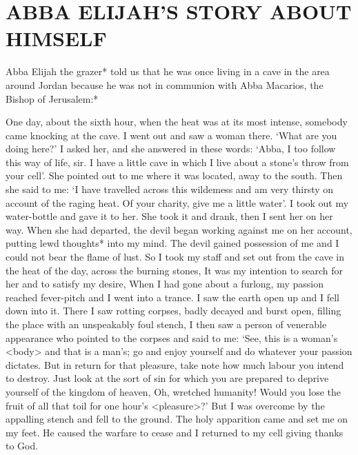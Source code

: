 \chapter{ABBA ELIJAH'S STORY ABOUT HIMSELF}

Abba Elijah the grazer* told us that he was once living in a cave in the area around Jordan because he was not in communion with Abba Macarios, the Bishop of Jerusalem:*

One day, about the sixth hour, when the heat was at its most intense, somebody came knocking at the cave.
I went out and saw a woman there.
`What are you doing here?' I asked her, and she answered in these words: `Abba, I too follow this way of life, sir.
I have a little cave in which I live about a stone's throw from your cell'.
She pointed out to me where it was located, away to the south.
Then she said to me: `I have travelled across this wildemess and am very thirsty on account of the raging heat.
Of your charity, give me a little water'.
I took out my water-bottle and gave it to her.
She took it and drank, then I sent her on her way.
When she had departed, the devil began working against me on her account, putting lewd thoughts* into my mind.
The devil gained possession of me and I could not bear the flame of lust.
So I took my staff and set out from the cave in the heat of the day, across the burning stones, It was my intention to search for her and to satisfy my desire, When I had gone about a furlong, my passion reached fever-pitch and I went into a trance.
I saw the earth open up and I fell down into it.
There I saw rotting corpses, badly decayed and burst open, filling the place with an unspeakably foul stench, I then saw a person of venerable appearance who pointed to the corpses and said to me: `See, this is a woman's <body> and that is a man's;
go and enjoy yourself and do whatever your passion dictates.
But in return for that pleasure, take note how much labour you intend to destroy.
Just look at the sort of sin for which you are prepared to deprive yourself of the kingdom of heaven, Oh, wretched humanity!
Would you lose the fruit of all that toil for one hour's <pleasure>?'
But I was overcome by the appalling stench and fell to the ground.
The holy apparition came and set me on my feet.
He caused the warfare to cease and I returned to my cell giving thanks to God.

